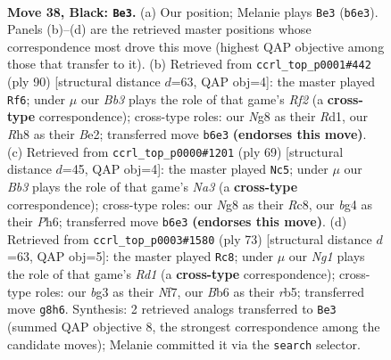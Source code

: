 \documentclass[11pt]{article}
\begin{document}
\clearpage

\begin{figure}[p]\centering
\begin{subfigure}{0.46\textwidth}\centering
\resizebox{\linewidth}{!}{%
\newchessgame
\chessboard[
  setfen={r5nr/p6p/1b3k2/8/6B1/PPp3BP/R1P3P1/1R5K b - - 1 38},
  showmover=false,
  pgfstyle=straightmove, color=movearrow, markmove={b6-e3}
]}
\caption{}
\end{subfigure}\hfill
\begin{subfigure}{0.46\textwidth}\centering
\resizebox{\linewidth}{!}{%
\newchessgame
\chessboard[
  setfen={8/2k1r2p/1pb3p1/p1n5/2P1p3/7P/P3BRP1/3R2K1 w - - 2 46},
  showmover=false,
  pgfstyle=straightmove, color=movearrow, markmove={f2-f6}
]}
\caption{}
\end{subfigure}
\\[4pt]
\begin{subfigure}{0.46\textwidth}\centering
\resizebox{\linewidth}{!}{%
\newchessgame
\chessboard[
  setfen={2r3k1/p4p2/n1r4p/6p1/3RP3/5PB1/6PP/3R2K1 b - - 0 35},
  showmover=false,
  pgfstyle=straightmove, color=movearrow, markmove={a6-c5}
]}
\caption{}
\end{subfigure}\hfill
\begin{subfigure}{0.46\textwidth}\centering
\resizebox{\linewidth}{!}{%
\newchessgame
\chessboard[
  setfen={3r1k2/5n2/8/1RP5/p2p1rp1/P2B4/1P6/1K1R4 b - - 0 37},
  showmover=false,
  pgfstyle=straightmove, color=movearrow, markmove={d8-c8}
]}
\caption{}
\end{subfigure}
\caption{\textbf{Move 38, Black: \texttt{Be3}.} (a) Our position; Melanie plays \texttt{Be3} (\texttt{b6e3}). Panels (b)--(d) are the retrieved master positions whose correspondence most drove this move (highest QAP objective among those that transfer to it). (b) Retrieved from \texttt{ccrl\_top\_p0001\#442} (ply 90) [structural distance $d$=63, QAP obj=4]: the master played \texttt{Rf6}; under $\mu$ our \emph{Bb3} plays the role of that game's \emph{Rf2} (a \textbf{cross-type} correspondence); cross-type roles: our \emph{N}g8 as their \emph{R}d1, our \emph{R}h8 as their \emph{B}e2; transferred move \texttt{b6e3} \textbf{(endorses this move)}. (c) Retrieved from \texttt{ccrl\_top\_p0000\#1201} (ply 69) [structural distance $d$=45, QAP obj=4]: the master played \texttt{Nc5}; under $\mu$ our \emph{Bb3} plays the role of that game's \emph{Na3} (a \textbf{cross-type} correspondence); cross-type roles: our \emph{N}g8 as their \emph{R}c8, our \emph{b}g4 as their \emph{P}h6; transferred move \texttt{b6e3} \textbf{(endorses this move)}. (d) Retrieved from \texttt{ccrl\_top\_p0003\#1580} (ply 73) [structural distance $d$=63, QAP obj=5]: the master played \texttt{Rc8}; under $\mu$ our \emph{Ng1} plays the role of that game's \emph{Rd1} (a \textbf{cross-type} correspondence); cross-type roles: our \emph{b}g3 as their \emph{N}f7, our \emph{B}b6 as their \emph{r}b5; transferred move \texttt{g8h6}. Synthesis: 2 retrieved analogs transferred to \texttt{Be3} (summed QAP objective 8, the strongest correspondence among the candidate moves); Melanie committed it via the \texttt{search} selector.}
\label{fig:thought-m75}
\end{figure}
\end{document}
